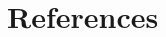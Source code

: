 \documentclass[a4paper]{jpconf}
\begin{document}


\section*{References}

\begin{thebibliography}{30}










\end{thebibliography}
\end{document}
